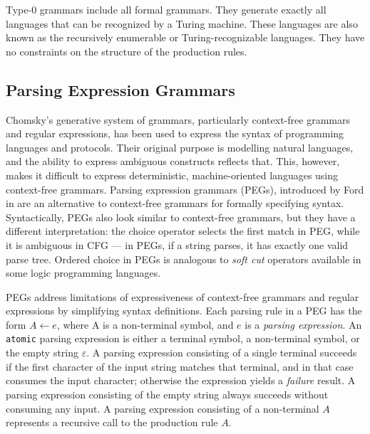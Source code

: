 \documentclass[english,engineering]{wizthesis}
\begin{document}
Type-0 grammars include all formal grammars. They generate exactly all languages
that can be recognized by a Turing machine. These languages are also known as
the recursively enumerable or Turing-recognizable languages. They have no
constraints on the structure of the production rules.

\subsection{Parsing Expression Grammars}

Chomsky's generative system of grammars, particularly context-free grammars and
regular expressions, has been used to express the syntax of programming
languages and protocols. Their original purpose is modelling natural languages,
and the ability to express ambiguous constructs reflects that. This, however,
makes it difficult to express deterministic, machine-oriented languages using
context-free grammars. Parsing expression grammars (PEGs), introduced by Ford in
\cite{ford-2004} are an alternative to context-free grammars for formally
specifying syntax. Syntactically, PEGs also look similar to context-free
grammars, but they have a different interpretation: the choice operator selects
the first match in PEG, while it is ambiguous in CFG --- in PEGs, if a string
parses, it has exactly one valid parse tree. Ordered choice in PEGs is analogous
to \emph{soft cut} operators available in some logic programming languages.

PEGs address limitations of expressiveness of context-free grammars and regular
expressions by simplifying syntax definitions. Each parsing rule in a PEG has
the form $A \leftarrow e$, where A is a non-terminal symbol, and $e$ is a
\emph{parsing expression}. An \texttt{atomic} parsing expression is either a
terminal symbol, a non-terminal symbol, or the empty string $\varepsilon$. A
parsing expression consisting of a single terminal succeeds if the first
character of the input string matches that terminal, and in that case consumes
the input character; otherwise the expression yields a \emph{failure} result. A
parsing expression consisting of the empty string always succeeds without
consuming any input. A parsing expression consisting of a non-terminal $A$
represents a recursive call to the production rule $A$. 
\end{document}
